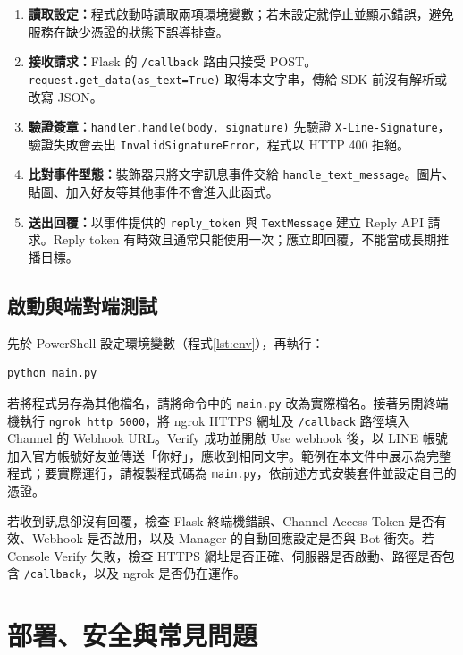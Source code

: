 \documentclass[a4paper,12pt]{report}
\begin{document}
\begin{enumerate}
  \item \textbf{讀取設定：}程式啟動時讀取兩項環境變數；若未設定就停止並顯示錯誤，避免服務在缺少憑證的狀態下誤導排查。
  \item \textbf{接收請求：}Flask 的 \texttt{/callback} 路由只接受 POST。\texttt{request.get\_data(as\_text=True)} 取得本文字串，傳給 SDK 前沒有解析或改寫 JSON。
  \item \textbf{驗證簽章：}\texttt{handler.handle(body, signature)} 先驗證 \texttt{X-Line-Signature}，驗證失敗會丟出 \texttt{InvalidSignatureError}，程式以 HTTP 400 拒絕。
  \item \textbf{比對事件型態：}裝飾器只將文字訊息事件交給 \texttt{handle\_text\_message}。圖片、貼圖、加入好友等其他事件不會進入此函式。
  \item \textbf{送出回覆：}以事件提供的 \texttt{reply\_token} 與 \texttt{TextMessage} 建立 Reply API 請求。Reply token 有時效且通常只能使用一次；應立即回覆，不能當成長期推播目標。
\end{enumerate}

\section{啟動與端對端測試}

先於 PowerShell 設定環境變數（程式\ref{lst:env}），再執行：
\begin{lstlisting}[language=bash,caption={啟動 Flask Bot 開發伺服器},label={lst:run}]
python main.py
\end{lstlisting}

若將程式另存為其他檔名，請將命令中的 \texttt{main.py} 改為實際檔名。接著另開終端機執行 \texttt{ngrok http 5000}，將 ngrok HTTPS 網址及 \texttt{/callback} 路徑填入 Channel 的 Webhook URL。Verify 成功並開啟 Use webhook 後，以 LINE 帳號加入官方帳號好友並傳送「你好」，應收到相同文字。範例在本文件中展示為完整程式；要實際運行，請複製程式碼為 \texttt{main.py}，依前述方式安裝套件並設定自己的憑證。

若收到訊息卻沒有回覆，檢查 Flask 終端機錯誤、Channel Access Token 是否有效、Webhook 是否啟用，以及 Manager 的自動回應設定是否與 Bot 衝突。若 Console Verify 失敗，檢查 HTTPS 網址是否正確、伺服器是否啟動、路徑是否包含 \texttt{/callback}，以及 ngrok 是否仍在運作。

\chapter{部署、安全與常見問題}
\end{document}
